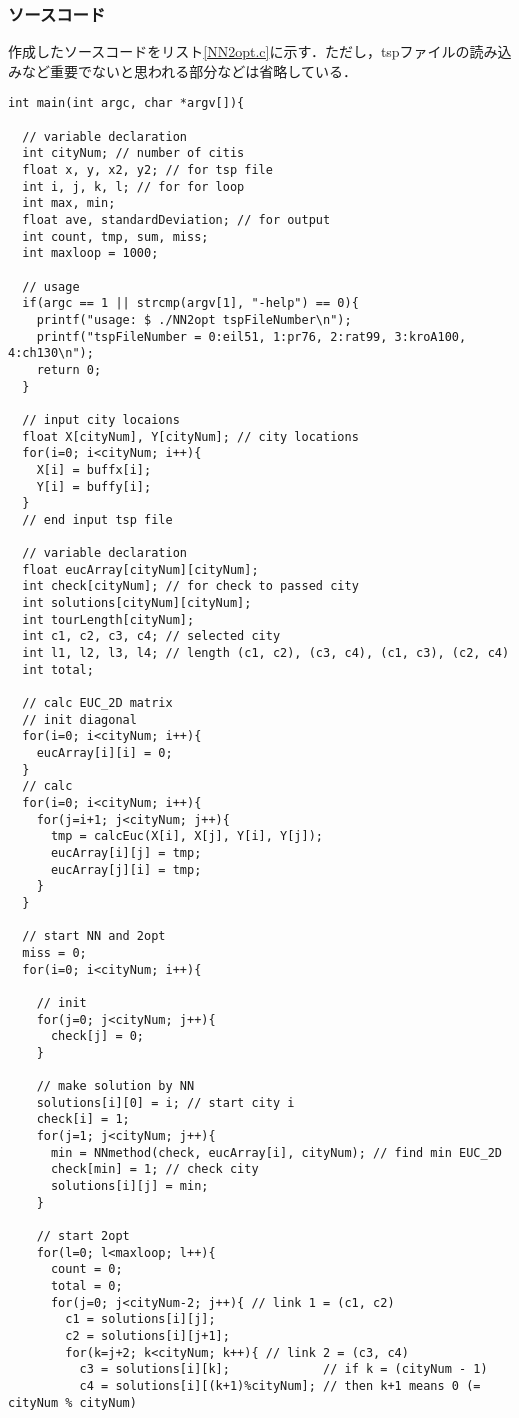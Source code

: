 \documentclass[a4j]{jarticle}
\begin{document}
\subsubsection*{ソースコード}
作成したソースコードをリスト\ref{NN2opt.c}に示す．ただし，tspファイルの読み込みなど重要でないと思われる部分などは省略している．
\begin{lstlisting}[caption=NN2opt.c, label=NN2opt.c, xleftmargin=1cm]
int main(int argc, char *argv[]){

  // variable declaration
  int cityNum; // number of citis
  float x, y, x2, y2; // for tsp file
  int i, j, k, l; // for for loop
  int max, min;
  float ave, standardDeviation; // for output
  int count, tmp, sum, miss;
  int maxloop = 1000;

  // usage
  if(argc == 1 || strcmp(argv[1], "-help") == 0){
    printf("usage: $ ./NN2opt tspFileNumber\n");
    printf("tspFileNumber = 0:eil51, 1:pr76, 2:rat99, 3:kroA100, 4:ch130\n");
    return 0;
  }

  // input city locaions
  float X[cityNum], Y[cityNum]; // city locations
  for(i=0; i<cityNum; i++){
    X[i] = buffx[i];
    Y[i] = buffy[i];
  }
  // end input tsp file

  // variable declaration
  float eucArray[cityNum][cityNum];
  int check[cityNum]; // for check to passed city
  int solutions[cityNum][cityNum];
  int tourLength[cityNum];
  int c1, c2, c3, c4; // selected city
  int l1, l2, l3, l4; // length (c1, c2), (c3, c4), (c1, c3), (c2, c4)
  int total;

  // calc EUC_2D matrix
  // init diagonal 
  for(i=0; i<cityNum; i++){
    eucArray[i][i] = 0;
  }
  // calc 
  for(i=0; i<cityNum; i++){
    for(j=i+1; j<cityNum; j++){
      tmp = calcEuc(X[i], X[j], Y[i], Y[j]);
      eucArray[i][j] = tmp;
      eucArray[j][i] = tmp;
    }
  }

  // start NN and 2opt
  miss = 0;
  for(i=0; i<cityNum; i++){

    // init
    for(j=0; j<cityNum; j++){
      check[j] = 0;
    }
    
    // make solution by NN
    solutions[i][0] = i; // start city i
    check[i] = 1;
    for(j=1; j<cityNum; j++){
      min = NNmethod(check, eucArray[i], cityNum); // find min EUC_2D
      check[min] = 1; // check city
      solutions[i][j] = min;
    }

    // start 2opt
    for(l=0; l<maxloop; l++){
      count = 0;
      total = 0;
      for(j=0; j<cityNum-2; j++){ // link 1 = (c1, c2)
        c1 = solutions[i][j];
        c2 = solutions[i][j+1];
        for(k=j+2; k<cityNum; k++){ // link 2 = (c3, c4)
          c3 = solutions[i][k];             // if k = (cityNum - 1) 
          c4 = solutions[i][(k+1)%cityNum]; // then k+1 means 0 (= cityNum % cityNum)
          

\end{lstlisting}
\end{document}
